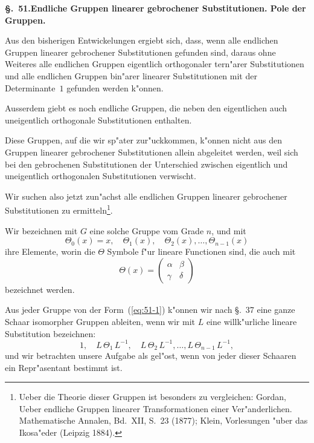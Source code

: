 \documentclass[12pt,a4paper]{article}
\theoremstyle{definition}
\begin{document}
\noindent\textbf{\S.~51.}\quad\textbf{Endliche Gruppen linearer gebrochener Substitutionen. Pole der Gruppen.}
\vspace{0.3cm}

Aus den bisherigen Entwickelungen ergiebt sich, dass, wenn alle endlichen Gruppen linearer gebrochener Substitutionen gefunden sind, daraus ohne Weiteres alle endlichen Gruppen eigentlich orthogonaler tern"arer Substitutionen und alle endlichen Gruppen bin"arer linearer Substitutionen mit der Determinante~$1$ gefunden werden k"onnen.

Ausserdem giebt es noch endliche Gruppen, die neben den eigentlichen auch uneigentlich orthogonale Substitutionen enthalten.

Diese Gruppen, auf die wir sp"ater zur"uckkommen, k"onnen nicht aus den Gruppen linearer gebrochener Substitutionen allein abgeleitet werden, weil sich bei den gebrochenen Substitutionen der Unterschied zwischen eigentlich und uneigentlich orthogonalen Substitutionen verwischt.

Wir suchen also jetzt zun"achst alle endlichen Gruppen linearer gebrochener Substitutionen zu ermitteln\footnote{Ueber die Theorie dieser Gruppen ist besonders zu vergleichen: Gordan, Ueber endliche Gruppen linearer Transformationen einer Ver"anderlichen. Mathematische Annalen, Bd.~XII, S.~23 (1877); Klein, Vorlesungen "uber das Ikosa"eder (Leipzig 1884).}.

Wir bezeichnen mit $G$ eine solche Gruppe vom Grade $n$, und mit
\begin{equation}\label{eq:51-1}
\Theta_0(x) = x, \quad \Theta_1(x), \quad \Theta_2(x), \ldots, \Theta_{n-1}(x)
\end{equation}
ihre Elemente, worin die $\Theta$ Symbole f"ur lineare Functionen sind, die auch mit
\begin{equation}\label{eq:51-2}
\Theta(x) = \begin{pmatrix} \alpha & \beta \\ \gamma & \delta \end{pmatrix}
\end{equation}
bezeichnet werden.

Aus jeder Gruppe von der Form~(\ref{eq:51-1}) k"onnen wir nach \S.~37 eine ganze Schaar isomorpher Gruppen ableiten, wenn wir mit $L$ eine willk"urliche lineare Substitution bezeichnen:
\begin{equation}\label{eq:51-3}
1, \quad L\,\Theta_1\,L^{-1}, \quad L\,\Theta_2\,L^{-1}, \ldots, L\,\Theta_{n-1}\,L^{-1},
\end{equation}
und wir betrachten unsere Aufgabe als gel"ost, wenn von jeder dieser Schaaren ein Repr"asentant bestimmt ist.
\end{document}
